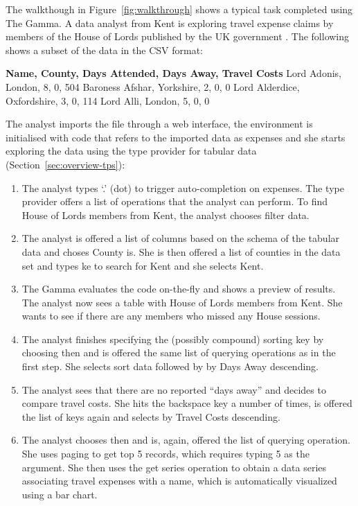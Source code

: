 \documentclass[manuscript,review,anonymous]{acmart}
\newcommand{\ikvd}[1]{{\fontfamily{zi4}\selectfont\small #1}}
\begin{document}
The walkthough in Figure~\ref{fig:walkthrough} shows a typical task completed using The Gamma.
A data analyst from Kent is exploring travel expense claims by members of the House of Lords published
by the UK government \cite{lords}. The following shows a subset of the data in the CSV format:


\begin{thegamma}
\textbf{Name, County, Days Attended, Days Away, Travel Costs}
Lord Adonis, London, 8, 0, 504
Baroness Afshar, Yorkshire, 2, 0, 0
Lord Alderdice, Oxfordshire, 3, 0, 114
Lord Alli, London, 5, 0, 0
\end{thegamma}

\noindent
The analyst imports the file through a web interface, the environment is initialised with code
that refers to the imported data as \ikvd{expenses} and she starts exploring the data using the type provider for tabular data (Section~\ref{sec:overview-tps}):

\begin{enumerate}
\item The analyst types `.' (dot) to trigger auto-completion on \ikvd{expenses}. The type provider
  offers a list of operations that the analyst can perform. To find House of Lords
  members from Kent, the analyst chooses \ikvd{filter data}.

\item The analyst is offered a list of columns based on the schema of the tabular data and choses
  \ikvd{County is}.  She is then offered a list of counties in the data set and types \ikvd{ke} to
  search for Kent and she selects \ikvd{Kent}.

\item The Gamma evaluates the code on-the-fly and shows a
  preview of results. The analyst now sees a table with House of Lords members from Kent.
  She wants to see if there are any members who missed any House sessions.

\item The analyst finishes specifying the (possibly compound) sorting key by choosing \ikvd{then}
  and is offered the same list of querying operations as in the first step. She selects
  \ikvd{sort data} followed by \ikvd{by Days Away descending}.

\item The analyst sees that there are no reported ``days away'' and decides to compare
  travel costs. She hits the backspace key a number of times, is offered the list
  of keys again and selects \ikvd{by Travel Costs descending}.

\item The analyst chooses \ikvd{then} and is,
  again, offered the list of querying operation. She uses \ikvd{paging} to get top 5 records,
  which requires typing \ikvd{5} as the argument. She then uses the \ikvd{get series} operation
  to obtain a data series associating travel expenses with a name, which is automatically
  visualized using a bar chart.
\end{enumerate}
\end{document}
